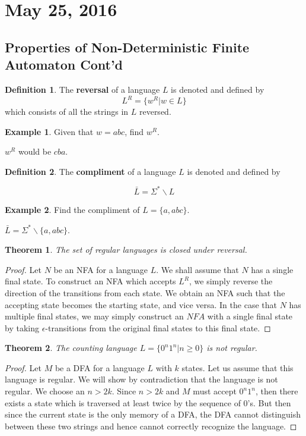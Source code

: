 \documentclass[11pt]{article}
\theoremstyle{plain} %
\newtheorem*{theorem}{Theorem}
\theoremstyle{definition}
\newtheorem*{definition}{Definition} %
\theoremstyle{example}
\newtheorem*{example}{Example}
\theoremstyle{remark}
\begin{document}
\section{May 25, 2016}
\subsection{Properties of Non-Deterministic Finite Automaton Cont'd}

\begin{definition}
The \textbf{reversal} of a language $L$ is denoted and defined by $$L^R = \{w^R | w\in L\}$$ which consists of all the strings in $L$ reversed.
\end{definition}

\begin{example}
Given that $w = abc$, find $w^R$.
\end{example}

$w^R$ would be $cba$.

\begin{definition}
The \textbf{compliment} of a language $L$ is denoted and defined by

$$\bar{L} = \Sigma^*\backslash L$$
\end{definition}

\begin{example}
Find the compliment of $L = \{a, abc\}$.
\end{example}

$\bar{L} = \Sigma^*\backslash\{a, abc\}$.
\begin{theorem}
The set of regular languages is closed under reversal.
\end{theorem}


\begin{proof}
Let $N$ be an NFA for a language $L$. We shall assume that $N$ has a single final state. To construct an NFA which accepts $L^R$, we simply reverse the direction of the transitions from each state. We obtain an NFA such that the accepting state becomes the starting state, and vice versa. In the case that $N$ has multiple final states, we may simply construct an $NFA$ with a single final state by taking $\epsilon$-transitions from the original final states to this final state.
\end{proof}

\begin{theorem}
The counting language $L = \{0^n1^n | n \geq 0 \}$ is not regular.
\end{theorem}

\begin{proof}
Let $M$ be a DFA for a language $L$ with $k$ states. Let us assume that this language is regular. We will show by contradiction that the language is not regular. We choose an $n > 2k$. Since $n > 2k$ and $M$ must accept $0^n1^n$, then there exists a state which is traversed at least twice by the sequence of 0's. But then since the current state is the only memory of a DFA, the DFA cannot distinguish between these two strings and hence cannot correctly recognize the language.
\end{proof}
\end{document}
